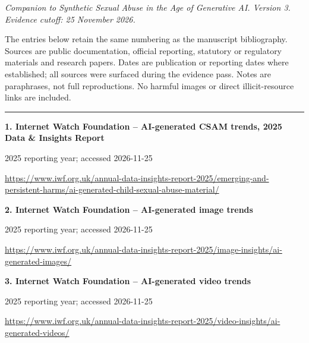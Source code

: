 \documentclass[11pt,a4paper]{article}
\begin{document}
\par\vspace{3mm}
\textit{Companion to Synthetic Sexual Abuse in the Age of Generative AI. Version 3. Evidence cutoff: 25 November 2026.}\par
The entries below retain the same numbering as the manuscript bibliography. Sources are public documentation, official reporting, statutory or regulatory materials and research papers. Dates are publication or reporting dates where established; all sources were surfaced during the evidence pass. Notes are paraphrases, not full reproductions. No harmful images or direct illicit-resource links are included.\par\hrule\vspace{3mm}
\noindent\begin{minipage}{\linewidth}\textbf{1. Internet Watch Foundation -- AI-generated CSAM trends, 2025 Data \& Insights Report}\par{\small 2025 reporting year; accessed 2026-11-25\par\url{https://www.iwf.org.uk/annual-data-insights-report-2025/emerging-and-persistent-harms/ai-generated-child-sexual-abuse-material/}}\par
\end{minipage}\par\vspace{2mm}
\noindent\begin{minipage}{\linewidth}\textbf{2. Internet Watch Foundation -- AI-generated image trends}\par{\small 2025 reporting year; accessed 2026-11-25\par\url{https://www.iwf.org.uk/annual-data-insights-report-2025/image-insights/ai-generated-images/}}\par
\end{minipage}\par\vspace{2mm}
\noindent\begin{minipage}{\linewidth}\textbf{3. Internet Watch Foundation -- AI-generated video trends}\par{\small 2025 reporting year; accessed 2026-11-25\par\url{https://www.iwf.org.uk/annual-data-insights-report-2025/video-insights/ai-generated-videos/}}\par
\end{minipage}\par\vspace{2mm}
\end{document}
